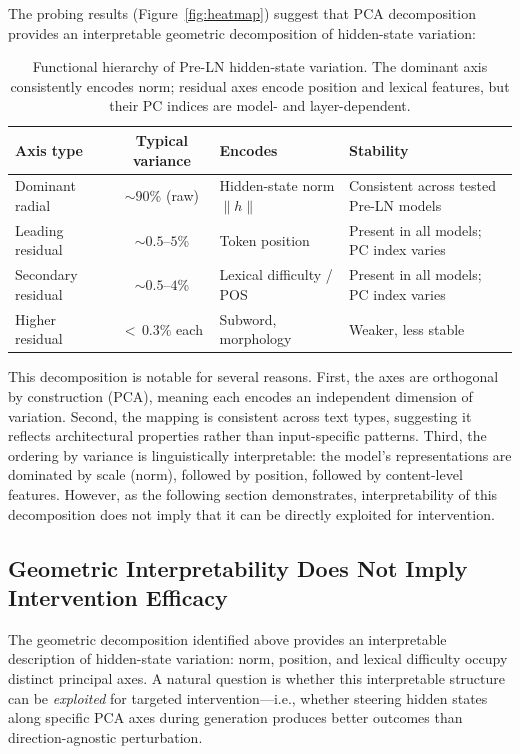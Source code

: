 \documentclass[11pt,a4paper]{article}
\begin{document}
The probing results (Figure~\ref{fig:heatmap}) suggest that PCA decomposition provides an interpretable geometric decomposition of hidden-state variation:

\begin{table}[h]
\centering
\caption{Functional hierarchy of Pre-LN hidden-state variation. The dominant axis consistently encodes norm; residual axes encode position and lexical features, but their PC indices are model- and layer-dependent.}
\label{tab:coords}
\begin{tabular}{lclp{5cm}}
\toprule
Axis type & Typical variance & Encodes & Stability \\
\midrule
Dominant radial & ${\sim}90$\% (raw) & Hidden-state norm $\|h\|$ & Consistent across tested Pre-LN models \\
Leading residual & ${\sim}0.5$--$5$\% & Token position & Present in all models; PC index varies \\
Secondary residual & ${\sim}0.5$--$4$\% & Lexical difficulty / POS & Present in all models; PC index varies \\
Higher residual & ${<}\,0.3$\% each & Subword, morphology & Weaker, less stable \\
\bottomrule
\end{tabular}
\end{table}

This decomposition is notable for several reasons. First, the axes are orthogonal by construction (PCA), meaning each encodes an independent dimension of variation. Second, the mapping is consistent across text types, suggesting it reflects architectural properties rather than input-specific patterns. Third, the ordering by variance is linguistically interpretable: the model's representations are dominated by scale (norm), followed by position, followed by content-level features. However, as the following section demonstrates, interpretability of this decomposition does not imply that it can be directly exploited for intervention.

\subsection{Geometric Interpretability Does Not Imply Intervention Efficacy}

The geometric decomposition identified above provides an interpretable description of hidden-state variation: norm, position, and lexical difficulty occupy distinct principal axes. A natural question is whether this interpretable structure can be \emph{exploited} for targeted intervention---i.e., whether steering hidden states along specific PCA axes during generation produces better outcomes than direction-agnostic perturbation.
\end{document}
